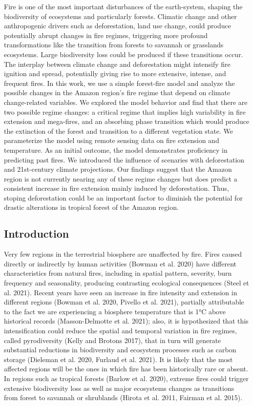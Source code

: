 \documentclass[
]{article}
\begin{document}
Fire is one of the most important disturbances of the earth-system,
shaping the biodiversity of ecosystems and particularly forests.
Climatic change and other anthropogenic drivers such as deforestation,
land use change, could produce potentially abrupt changes in fire
regimes, triggering more profound transformations like the transition
from forests to savannah or grasslands ecosystems. Large biodiversity
loss could be produced if these transitions occur. The interplay between
climate change and deforestation might intensify fire ignition and
spread, potentially giving rise to more extensive, intense, and frequent
fires. In this work, we use a simple forest-fire model and analyze the
possible changes in the Amazon region's fire regime that depend on
climate change-related variables. We explored the model behavior and
find that there are two possible regime changes: a critical regime that
implies high variability in fire extension and mega-fires, and an
absorbing phase transition which would produce the extinction of the
forest and transition to a different vegetation state. We parameterize
the model using remote sensing data on fire extension and temperature.
As an initial outcome, the model demonstrates proficiency in predicting
past fires. We introduced the influence of scenaries with deforestation
and 21st-century climate projections. Our findings suggest that the
Amazon region is not currently nearing any of these regime changes but
does predict a consistent increase in fire extension mainly induced by
deforestation. Thus, stoping deforestation could be an important factor
to diminish the potential for drastic alterations in tropical forest of
the Amazon region.

\subsection{Introduction}\label{introduction}

Very few regions in the terrestrial biosphere are unaffected by fire.
Fires caused directly or indirectly by human activities (Bowman et al.
2020) have different characteristics from natural fires, including in
spatial pattern, severity, burn frequency and seasonality, producing
contrasting ecological consequences (Steel et al. 2021). Recent years
have seen an increase in fire intensity and extension in different
regions (Bowman et al. 2020, Pivello et al. 2021), partially
attributable to the fact we are experiencing a biosphere temperature
that is 1°C above historical records (Masson-Delmotte et al. 2021);
also, it is hypothesized that this intensification could reduce the
spatial and temporal variation in fire regimes, called pyrodiversity
(Kelly and Brotons 2017), that in turn will generate substantial
reductions in biodiversity and ecosystem processes such as carbon
storage (Dieleman et al. 2020, Furlaud et al. 2021). It is likely that
the most affected regions will be the ones in which fire has been
historically rare or absent. In regions such as tropical forests (Barlow
et al. 2020), extreme fires could trigger extensive biodiversity loss as
well as major ecosystems changes as transitions from forest to savannah
or shrublands (Hirota et al. 2011, Fairman et al. 2015).
\end{document}
